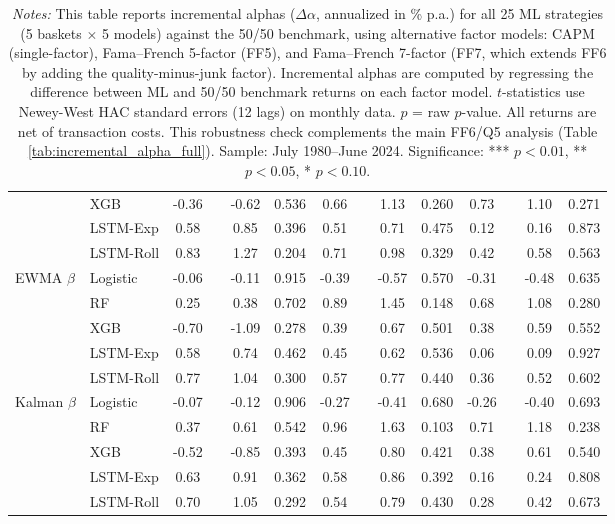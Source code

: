 \begin{table}[htbp]
{\begin{tabular}{l l S[table-format=2.2] l S[table-format=1.2] S[table-format=1.3] S[table-format=2.2] l S[table-format=1.2] S[table-format=1.3] S[table-format=2.2] l S[table-format=1.2] S[table-format=1.3]}
 & XGB & {-0.36} &  & {-0.62} & 0.536 & {0.66} &  & {1.13} & 0.260 & {0.73} &  & {1.10} & 0.271 \\
 & LSTM-Exp & {0.58} &  & {0.85} & 0.396 & {0.51} &  & {0.71} & 0.475 & {0.12} &  & {0.16} & 0.873 \\
 & LSTM-Roll & {0.83} &  & {1.27} & 0.204 & {0.71} &  & {0.98} & 0.329 & {0.42} &  & {0.58} & 0.563 \\
\midrule
EWMA $\beta$ & Logistic & {-0.06} &  & {-0.11} & 0.915 & {-0.39} &  & {-0.57} & 0.570 & {-0.31} &  & {-0.48} & 0.635 \\
 & RF & {0.25} &  & {0.38} & 0.702 & {0.89} &  & {1.45} & 0.148 & {0.68} &  & {1.08} & 0.280 \\
 & XGB & {-0.70} &  & {-1.09} & 0.278 & {0.39} &  & {0.67} & 0.501 & {0.38} &  & {0.59} & 0.552 \\
 & LSTM-Exp & {0.58} &  & {0.74} & 0.462 & {0.45} &  & {0.62} & 0.536 & {0.06} &  & {0.09} & 0.927 \\
 & LSTM-Roll & {0.77} &  & {1.04} & 0.300 & {0.57} &  & {0.77} & 0.440 & {0.36} &  & {0.52} & 0.602 \\
\midrule
Kalman $\beta$ & Logistic & {-0.07} &  & {-0.12} & 0.906 & {-0.27} &  & {-0.41} & 0.680 & {-0.26} &  & {-0.40} & 0.693 \\
 & RF & {0.37} &  & {0.61} & 0.542 & {0.96} &  & {1.63} & 0.103 & {0.71} &  & {1.18} & 0.238 \\
 & XGB & {-0.52} &  & {-0.85} & 0.393 & {0.45} &  & {0.80} & 0.421 & {0.38} &  & {0.61} & 0.540 \\
 & LSTM-Exp & {0.63} &  & {0.91} & 0.362 & {0.58} &  & {0.86} & 0.392 & {0.16} &  & {0.24} & 0.808 \\
 & LSTM-Roll & {0.70} &  & {1.05} & 0.292 & {0.54} &  & {0.79} & 0.430 & {0.28} &  & {0.42} & 0.673 \\
\bottomrule
\end{tabular}%
}
\caption*{\footnotesize \textit{Notes:} This table reports incremental alphas ($\Delta\alpha$, annualized in \% p.a.) for all 25 ML strategies (5 baskets $\times$ 5 models) against the 50/50 benchmark, using alternative factor models: CAPM (single-factor), Fama--French 5-factor (FF5), and Fama--French 7-factor (FF7, which extends FF6 by adding the quality-minus-junk factor). Incremental alphas are computed by regressing the difference between ML and 50/50 benchmark returns on each factor model. $t$-statistics use Newey-West HAC standard errors (12 lags) on monthly data. $p$ = raw $p$-value. All returns are net of transaction costs. This robustness check complements the main FF6/Q5 analysis (Table \ref{tab:incremental_alpha_full}). Sample: July 1980--June 2024. Significance: *** $p<0.01$, ** $p<0.05$, * $p<0.10$.}
\end{table}